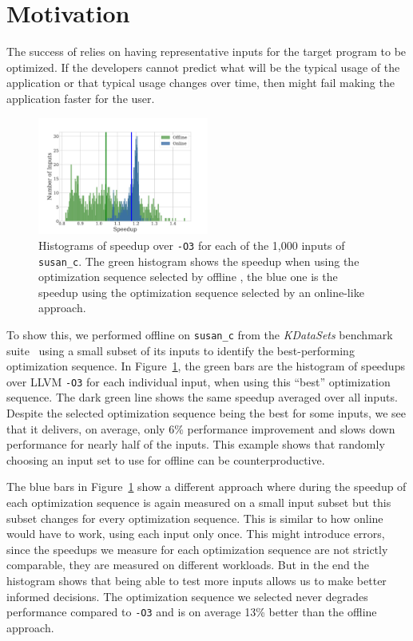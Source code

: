 \section{Motivation}

The success of \itercomp relies on having representative inputs for the target program to be optimized. If the developers cannot predict
what will be the typical usage of the application or that typical usage changes over time, then \itercomp might fail making the application
faster for the user.

\begin{figure}[t!]
    \centering
    \includegraphics[width=0.5\textwidth]{figs/motivation-online.pdf}
    \caption{Histograms of speedup over \texttt{-O3} for each of the 1,000 inputs of \texttt{susan\_c}. The green histogram shows the speedup when using
    the optimization sequence selected by offline \itercomp, the blue one is the speedup using the optimization sequence selected by an
    online-like approach.}
    \label{fig:motivation-online}
\end{figure}

To show this, we performed offline \itercomp on \texttt{susan\_c} from the \textit{KDataSets} benchmark suite~\cite{chen10,chen12a} using a
small subset of its inputs to identify the best-performing optimization sequence. In Figure~\ref{fig:motivation-online}, the green bars are
the histogram of speedups over LLVM \texttt{-O3} for each individual input, when using this ``best'' optimization sequence. The dark green line shows the same speedup
averaged over all inputs. Despite the selected optimization sequence being the best for some inputs, we see that it delivers, on average,
only 6\% performance improvement and slows down performance for nearly half of the inputs. This example shows that randomly choosing an
input set to use for offline \itercomp can be counterproductive.

The blue bars  in
Figure~\ref{fig:motivation-online} show a different approach where during \itercomp the speedup of each optimization sequence is again
measured on a small input subset but this subset changes for every optimization sequence. This is similar to how online \itercomp would
have to work, using each input only once. This might introduce errors, since the speedups we measure for each optimization sequence are not
strictly comparable, they are measured on different workloads. But in the end the histogram shows that being able to test more inputs
allows us to make better informed decisions. The optimization sequence we selected never degrades performance compared to \texttt{-O3} and
is on average 13\% better than the offline approach.

